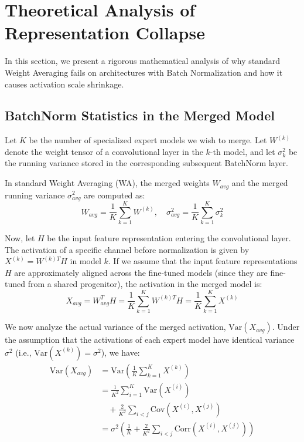 \documentclass{article}
\theoremstyle{plain}
\theoremstyle{definition}
\theoremstyle{remark}
\begin{document}
\section{Theoretical Analysis of Representation Collapse}
\label{sec:theory}

In this section, we present a rigorous mathematical analysis of why standard Weight Averaging fails on architectures with Batch Normalization and how it causes activation scale shrinkage.

\subsection{ BatchNorm Statistics in the Merged Model}

Let $K$ be the number of specialized expert models we wish to merge. Let $W^{(k)}$ denote the weight tensor of a convolutional layer in the $k$-th model, and let $\sigma^2_k$ be the running variance stored in the corresponding subsequent BatchNorm layer. 

In standard Weight Averaging (WA), the merged weights $W_{avg}$ and the merged running variance $\sigma^2_{avg}$ are computed as:
\begin{equation}
    W_{avg} = \frac{1}{K} \sum_{k=1}^K W^{(k)}, \quad \sigma^2_{avg} = \frac{1}{K} \sum_{k=1}^K \sigma^2_k
\label{eq:wa}
\end{equation}

Now, let $H$ be the input feature representation entering the convolutional layer. The activation of a specific channel before normalization is given by $X^{(k)} = W^{(k) T} H$ in model $k$. If we assume that the input feature representations $H$ are approximately aligned across the fine-tuned models (since they are fine-tuned from a shared progenitor), the activation in the merged model is:
\begin{equation}
    X_{avg} = W_{avg}^T H = \frac{1}{K} \sum_{k=1}^K W^{(k) T} H = \frac{1}{K} \sum_{k=1}^K X^{(k)}
\label{eq:act_avg}
\end{equation}

We now analyze the actual variance of the merged activation, $\text{Var}(X_{avg})$. Under the assumption that the activations of each expert model have identical variance $\sigma^2$ (i.e., $\text{Var}(X^{(k)}) = \sigma^2$), we have:
\begin{equation}
    \begin{aligned}
        \text{Var}(X_{avg}) &= \text{Var}\left( \frac{1}{K} \sum_{k=1}^K X^{(k)} \right) \\
        &= \frac{1}{K^2} \sum_{i=1}^K \text{Var}(X^{(i)}) \\
        &\quad + \frac{2}{K^2} \sum_{i < j} \text{Cov}(X^{(i)}, X^{(j)}) \\
        &= \sigma^2 \left( \frac{1}{K} + \frac{2}{K^2} \sum_{i < j} \text{Corr}(X^{(i)}, X^{(j)}) \right)
    \end{aligned}
\label{eq:var_true}
\end{equation}
\end{document}
